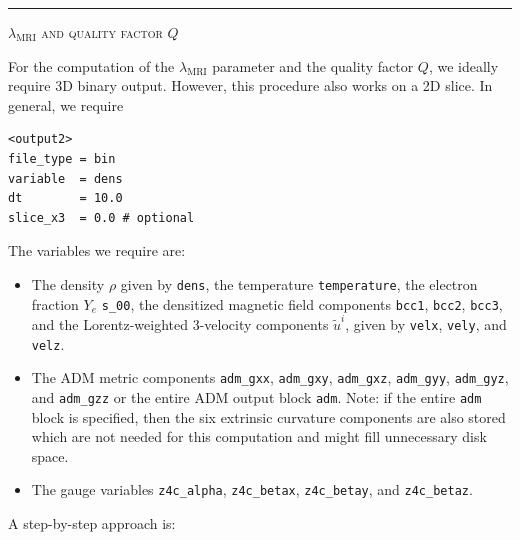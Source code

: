 \documentclass{article}
\newcommand{\var}[1]{%
  {\setlength{\fboxsep}{1.5pt}%
   \colorbox{varbg}{\textcolor{varfg}{\texttt{\small #1}}}}}
\newcommand{\step}[1]{%
  \par\medskip\noindent
  {\color{stepfg}\rule[-0.15ex]{2pt}{1.5ex}\hspace{0.5em}\scshape #1}%
  \hspace{0.75em}\ignorespaces}
\begin{document}
\step{$\lambda_{\mathrm{MRI}}$ and quality factor $Q$}
For the computation of the $\lambda_{\mathrm{MRI}}$ parameter and the quality factor $Q$, we ideally require 3D
binary output. However, this procedure also works on a 2D slice. In general, we require
\begin{verbatim}
<output2>
file_type = bin
variable  = dens
dt        = 10.0
slice_x3  = 0.0 # optional
\end{verbatim}
The variables we require are:
\begin{itemize}
  \item The density $\rho$ given by \var{dens}, the temperature \var{temperature}, the electron fraction $Y_e$ \var{s\_00},
  the densitized magnetic field components \var{bcc1}, \var{bcc2}, \var{bcc3}, and the Lorentz-weighted 3-velocity components $\tilde{u}^i$, given
  by \var{velx}, \var{vely}, and \var{velz}.
  \item The ADM metric components \var{adm\_gxx}, \var{adm\_gxy}, \var{adm\_gxz},
  \var{adm\_gyy}, \var{adm\_gyz}, and \var{adm\_gzz} or the entire ADM output block \var{adm}. Note:
  if the entire \var{adm} block is specified, then the six extrinsic curvature components are also
  stored which are not needed for this computation and might fill unnecessary disk space.
  \item The gauge variables \var{z4c\_alpha}, \var{z4c\_betax}, \var{z4c\_betay}, and \var{z4c\_betaz}.
\end{itemize}
A step-by-step approach is:
\end{document}
